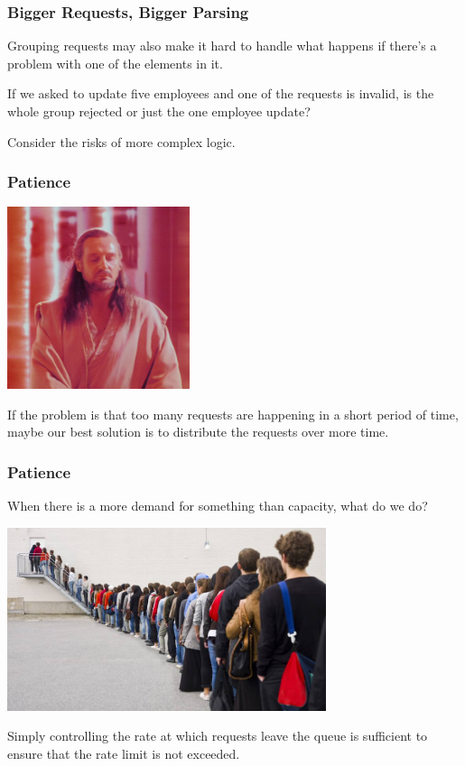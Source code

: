 \begin{frame}
\frametitle{Bigger Requests, Bigger Parsing}

Grouping requests may also make it hard to handle what happens if there's a problem with one of the elements in it. 

If we asked to update five employees and one of the requests is invalid, is the whole group rejected or just the one employee update?

Consider the risks of more complex logic.

\end{frame}

\begin{frame}
\frametitle{Patience}

\begin{center}
  \includegraphics[width=0.4\textwidth]{images/patience.jpg}
\end{center}

If the problem is that too many requests are happening in a short period of time, maybe our best solution is to distribute the requests over more time.

\end{frame}

\begin{frame}
\frametitle{Patience}
When there is a more demand for something than capacity, what do we do?

\begin{center}
  \includegraphics[width=0.7\textwidth]{images/lineup.jpg}
\end{center}

Simply controlling the rate at which requests leave the queue is sufficient to ensure that the rate limit is not exceeded. 

\end{frame}

